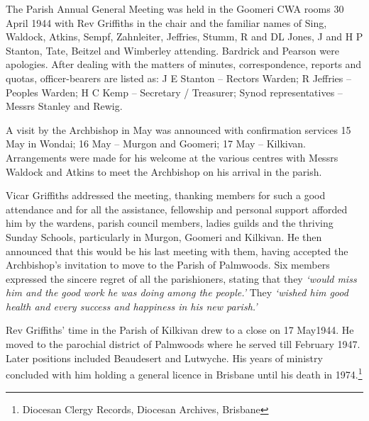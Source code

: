 The Parish Annual General Meeting was held in the Goomeri CWA rooms 30 April 1944 with Rev Griffiths in the chair and the familiar names of Sing, Waldock, Atkins, Sempf, Zahnleiter, Jeffries, Stumm, R and DL Jones, J and H P Stanton, Tate, Beitzel and Wimberley attending. Bardrick and Pearson were apologies. After dealing with the matters of minutes, correspondence, reports and quotas, officer-bearers are listed as: J E Stanton -- Rectors Warden; R Jeffries -- Peoples Warden; H C Kemp -- Secretary / Treasurer; Synod representatives -- Messrs Stanley and Rewig.



A visit by the Archbishop in May was announced with confirmation services 15 May in Wondai; 16 May -- Murgon and Goomeri; 17 May -- Kilkivan. Arrangements were made for his welcome at the various centres with Messrs Waldock and Atkins to meet the Archbishop on his arrival in the parish.



Vicar Griffiths addressed the meeting, thanking members for such a good attendance and for all the assistance, fellowship and personal support afforded him by the wardens, parish council members, ladies guilds and the thriving Sunday Schools, particularly in Murgon, Goomeri and Kilkivan. He then announced that this would be his last meeting with them, having accepted the Archbishop's invitation to move to the Parish of Palmwoods. Six members expressed the sincere regret of all the parishioners, stating that they \emph{`would miss him and the good work he was doing among the people.'} They \emph{`wished him good health and every success and happiness in his new parish.'}



Rev Griffiths' time in the Parish of Kilkivan drew to a close on 17 May1944. He moved to the parochial district of Palmwoods where he served till February 1947. Later positions included Beaudesert and Lutwyche. His years of ministry concluded with him holding a general licence in Brisbane until his death in 1974.\footnote{Diocesan Clergy Records, Diocesan Archives, Brisbane}


\balance


